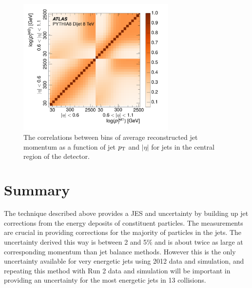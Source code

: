 \begin{figure}[ht]
\centering
\includegraphics[width=0.7\textwidth]{figures/correlation.pdf}
\caption{ The correlations between bins of average reconstructed jet momentum as a function of jet $p_{\mathrm{T}}$ and $|\eta|$ for jets in the central region of the detector.}
\label{fig:jes_correlations}
\end{figure}

\section{Summary}
The technique described above provides a \acl{JES} and uncertainty by building up jet corrections from the energy deposits of constituent particles.
The \ep measurements are crucial in providing corrections for the majority of particles in the jets.
The uncertainty derived this way is between 2 and 5\% and is about twice as large at corresponding momentum than jet balance methods.
However this is the only uncertainty available for very energetic jets using 2012 data and simulation, and repeating this method with Run 2 data and simulation will be important in providing an uncertainty for the most energetic jets in 13 \TeV collisions.

